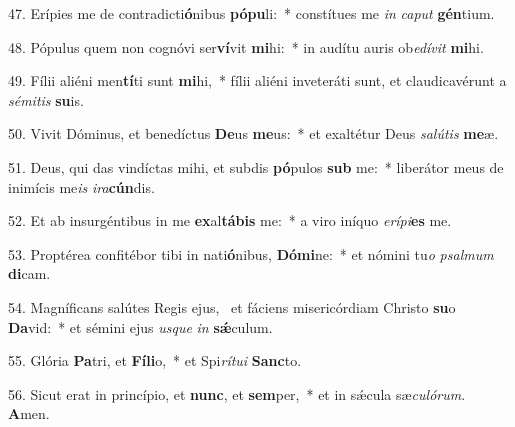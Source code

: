 47. Erípies me de contradicti\textbf{ó}nibus \textbf{pó}\textbf{pu}li:~*  constítues me \textit{in} \textit{ca}\textit{put} \textbf{gén}tium.\

48. Pópulus quem non cognóvi ser\textbf{ví}vit \textbf{mi}hi:~*  in audítu auris ob\textit{e}\textit{dí}\textit{vit} \textbf{mi}hi.\

49. Fílii aliéni men\textbf{tí}ti sunt \textbf{mi}hi,~*  fílii aliéni inveteráti sunt, et claudicavérunt a \textit{sé}\textit{mi}\textit{tis} \textbf{su}is.\

50. Vivit Dóminus, et benedíctus \textbf{De}us \textbf{me}us:~*  et exaltétur Deus \textit{sa}\textit{lú}\textit{tis} \textbf{me}æ.\

51. Deus, qui das vindíctas mihi, et subdis \textbf{pó}pulos \textbf{sub} me:~*  liberátor meus de inimícis me\textit{is} \textit{i}\textit{ra}\textbf{cún}dis.\

52. Et ab insurgéntibus in me \textbf{ex}al\textbf{tá}\textbf{bis} me:~*  a viro iníquo \textit{e}\textit{rí}\textit{pi}\textbf{es} me.\

53. Proptérea confitébor tibi in nati\textbf{ó}nibus, \textbf{Dó}\textbf{mi}ne:~*  et nómini tu\textit{o} \textit{psal}\textit{mum} \textbf{di}cam.\

54. Magníficans salútes Regis ejus, \dag\  et fáciens misericórdiam Christo \textbf{su}o \textbf{Da}vid:~*  et sémini ejus \textit{us}\textit{que} \textit{in} \textbf{sǽ}culum.\

55. Glória \textbf{Pa}tri, et \textbf{Fí}\textbf{li}o,~*  et Spi\textit{rí}\textit{tu}\textit{i} \textbf{Sanc}to.\

56. Sicut erat in princípio, et \textbf{nunc}, et \textbf{sem}per,~*  et in sǽcula sæ\textit{cu}\textit{ló}\textit{rum}. \textbf{A}men.\

